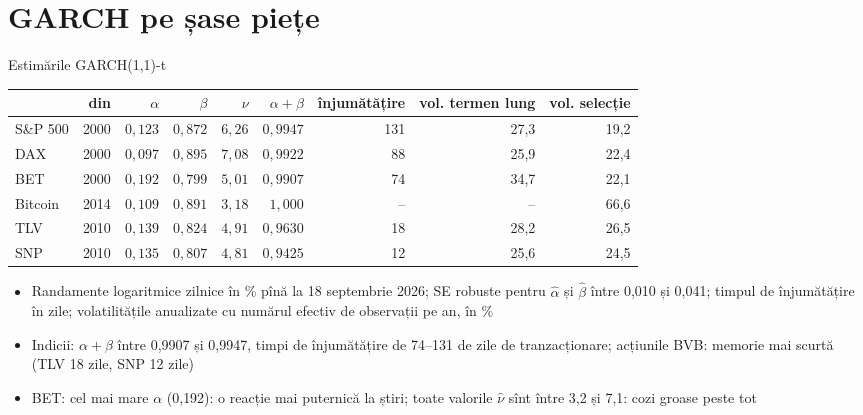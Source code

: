 \section{GARCH pe șase piețe}

\begin{frame}{Estimările GARCH(1,1)-t}
\itemsize{\footnotesize}
\begin{center}
\scriptsize
\begin{tabular}{lrrrrrrrr}
\toprule
& din & $\alpha$ & $\beta$ & $\nu$ & $\alpha + \beta$ & înjumătățire & vol. termen lung & vol. selecție \\
\midrule
S\&P 500 & 2000 & $0{,}123$ & $0{,}872$ & $6{,}26$ & $0{,}9947$ & 131 & 27{,}3 & 19{,}2 \\
DAX & 2000 & $0{,}097$ & $0{,}895$ & $7{,}08$ & $0{,}9922$ & 88 & 25{,}9 & 22{,}4 \\
BET & 2000 & $0{,}192$ & $0{,}799$ & $5{,}01$ & $0{,}9907$ & 74 & 34{,}7 & 22{,}1 \\
Bitcoin & 2014 & $0{,}109$ & $0{,}891$ & $3{,}18$ & $1{,}000$ & -- & -- & 66{,}6 \\
TLV & 2010 & $0{,}139$ & $0{,}824$ & $4{,}91$ & $0{,}9630$ & 18 & 28{,}2 & 26{,}5 \\
SNP & 2010 & $0{,}135$ & $0{,}807$ & $4{,}81$ & $0{,}9425$ & 12 & 25{,}6 & 24{,}5 \\
\bottomrule
\end{tabular}
\end{center}
\begin{itemize}
    \item Randamente logaritmice zilnice în \% pînă la 18 septembrie 2026; SE robuste pentru $\hat\alpha$ și $\hat\beta$ între 0{,}010 și 0{,}041; timpul de înjumătățire în zile; volatilitățile anualizate cu numărul efectiv de observații pe an, în \%
    \item Indicii: $\alpha + \beta$ între 0{,}9907 și 0{,}9947, timpi de înjumătățire de 74--131 de zile de tranzacționare; acțiunile BVB: memorie mai scurtă (TLV 18 zile, SNP 12 zile)
    \item BET: cel mai mare $\alpha$ (0{,}192): o reacție mai puternică la știri; toate valorile $\hat\nu$ sînt între 3{,}2 și 7{,}1: cozi groase peste tot
\end{itemize}
\end{frame}

